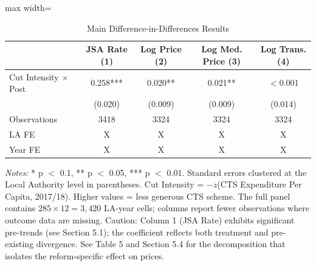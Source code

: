 \begin{table}
\centering
\caption{Main Difference-in-Differences Results}
\centering
\begin{adjustbox}{max width=\textwidth}
\begin{tabular}[t]{lcccc}
\toprule
  & JSA Rate
(1) & Log Price
(2) & Log Med.
Price (3) & Log Trans.
(4)\\
\midrule
Cut Intensity $\times$ Post & \num{0.258}*** & \num{0.020}** & \num{0.021}** & $<$\num{0.001}\\
 & (\num{0.020}) & (\num{0.009}) & (\num{0.009}) & (\num{0.014})\\
\midrule
Observations & \num{3418} & \num{3324} & \num{3324} & \num{3324}\\
LA FE & X & X & X & X\\
Year FE & X & X & X & X\\
\bottomrule

\end{tabular}
\end{adjustbox}
\begin{flushleft}
\footnotesize
\textit{Notes:} * p $<$ 0.1, ** p $<$ 0.05, *** p $<$ 0.01. Standard errors clustered at the Local Authority level in parentheses. Cut Intensity = $-z$(CTS Expenditure Per Capita, 2017/18). Higher values = less generous CTS scheme. The full panel contains $285 \times 12 = 3{,}420$ LA-year cells; columns report fewer observations where outcome data are missing. Caution: Column 1 (JSA Rate) exhibits significant pre-trends (see Section 5.1); the coefficient reflects both treatment and pre-existing divergence. See Table 5 and Section 5.4 for the decomposition that isolates the reform-specific effect on prices.
\end{flushleft}
\end{table}
